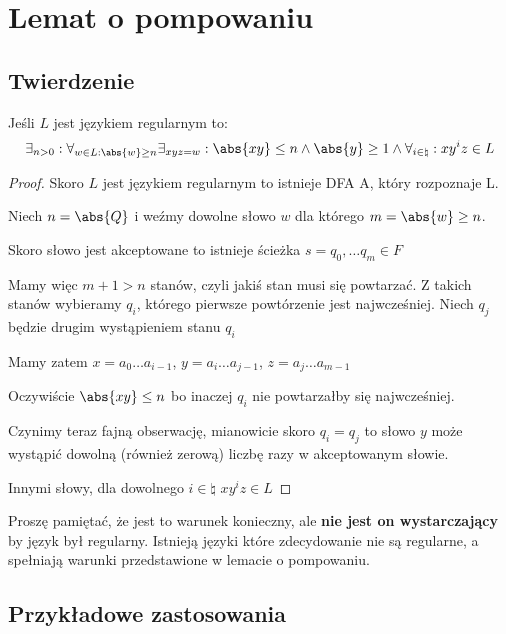 \section{Lemat o pompowaniu} 

\subsection{Twierdzenie}

\begin{lemma}[O pompowaniu]
    Jeśli \( L \) jest językiem regularnym to:
    \[
        \exists_{n > 0} : \forall_{w \in L : \abs{w} \geq n} \exists_{xyz = w} : \abs{xy} \leq n \land \abs{y} \geq 1 \land \forall_{i \in \natural} : xy^iz \in L
    \]
\end{lemma}
\begin{proof}
    Skoro \( L \) jest językiem regularnym to istnieje DFA A, który rozpoznaje L.
    
    Niech \( n = \abs{Q} \) i weźmy dowolne słowo \( w \) dla którego \( m = \abs{w} \geq n \).
    
    Skoro słowo jest akceptowane to istnieje ścieżka \( s = q_0, \dots q_m \in F \)
    
    Mamy więc \( m + 1 > n \) stanów, czyli jakiś stan musi się powtarzać. 
    Z takich stanów wybieramy \( q_i \), którego pierwsze powtórzenie jest najwcześniej. Niech \( q_j \) będzie drugim wystąpieniem stanu \( q_i \)
    
    Mamy zatem \( x = a_0\dots a_{i-1} \), \( y = a_i\dots a_{j-1} \), \( z = a_j \dots a_{m-1} \)
    
    Oczywiście \( \abs{xy} \leq n \) bo inaczej \( q_i \) nie powtarzałby się najwcześniej.
    
    Czynimy teraz fajną obserwację, mianowicie skoro  \( q_i = q_j \) to słowo \( y \) może wystąpić dowolną (również zerową) liczbę razy w akceptowanym słowie.
    
    Innymi słowy, dla dowolnego \( i \in \natural \) \( xy^iz \in L \)
\end{proof}

Proszę pamiętać, że jest to warunek konieczny, ale \textbf{nie jest on wystarczający} by język był regularny. Istnieją języki które zdecydowanie nie są regularne, a spełniają warunki przedstawione w lemacie o pompowaniu. 

\subsection{Przykładowe zastosowania}

